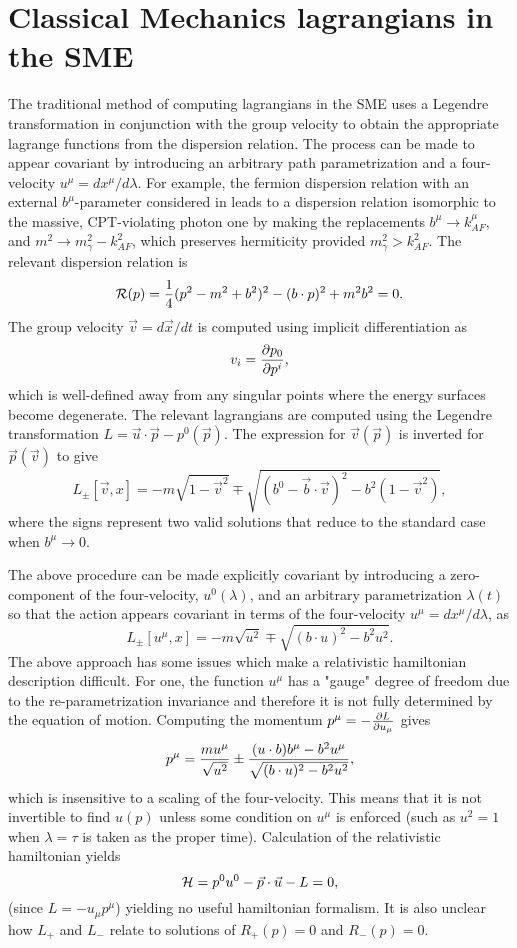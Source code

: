 \documentclass[a4paper]{jpconf}
\def\ga{\gamma}
\def\la{\lambda}
\newcommand{\beq}{\begin{displaymath}}
\newcommand{\eeq}{\end{displaymath}}
\begin{document}
\section{Classical Mechanics lagrangians in the SME}
The traditional method of computing lagrangians in the SME \cite{kosruss} uses a Legendre
transformation in conjunction with the group velocity to obtain the appropriate lagrange functions
from the dispersion relation.  
The process can be made to appear covariant by introducing an arbitrary path parametrization
and a four-velocity $u^\mu = d x^\mu / d \la$.
For example, the fermion dispersion relation with an external $b^\mu$-parameter considered
in \cite{kosruss} leads to a
dispersion relation isomorphic to the massive, CPT-violating photon one by making the replacements 
$b^\mu \rightarrow k_{AF}^\mu$, and $m^2 \rightarrow m_\ga^2 - k_{AF}^2$,
which preserves hermiticity provided $m_\ga^2 > k_{AF}^2$.
The relevant dispersion relation is
\beq
{\cal R}(p) = {1 \over 4} (p^2 - m^2 + b^2)^2 - (b \cdot p)^2 + m^2 b^2 = 0.
\eeq
The group velocity $\vec v = d \vec x / d t$ is computed using implicit differentiation as
\beq
{v_i} = {\partial p_0 \over  \partial p^i},
\eeq
which is well-defined away from any singular points where the energy surfaces become degenerate.
The relevant lagrangians are computed using the Legendre transformation $L = \vec  u \cdot \vec p - p^0(\vec p)$.
The expression for $\vec v (\vec p)$ is inverted for $\vec p(\vec v)$ to give
\beq
L_{\pm}[\vec v, x] = -m \sqrt{1 - \vec v^2} \mp \sqrt{(b^0 - \vec b \cdot \vec v)^2 - b^2 (1 - \vec v^2)},
\eeq
where the signs represent two valid solutions that reduce to the standard case when 
$b^\mu \rightarrow 0$.

The above procedure can be made explicitly covariant by introducing a zero-component 
of the four-velocity, $u^0(\la)$, and an 
arbitrary parametrization $\la(t)$ so that the action appears covariant in terms of the
four-velocity $u^\mu = d x^\mu  / d \la$, as
\beq
L_{\pm}[u^\mu, x] = -m \sqrt{u^2} \mp \sqrt{(b \cdot u)^2 - b^2 u^2}.
\eeq
The above approach has some issues which make a relativistic hamiltonian description difficult.
For one, the function $u^\mu$ has a "gauge" degree of freedom due to the
re-parametrization invariance and therefore it is not fully determined by the equation
of motion.
Computing the momentum $p^\mu = - {\partial L \over \partial u_\mu}$ gives
\beq
p^\mu = {m u^\mu \over \sqrt{u^2}} \pm 
{(u \cdot b) b^\mu - b^2 u^\mu \over \sqrt{(b \cdot u)^2 - b^2 u^2}},
\eeq
which is insensitive to a scaling of the four-velocity.  
This means that it is not invertible to find $u(p)$ unless some condition on $u^\mu$ is
enforced (such as $u^2 = 1$ when $\la = \tau$ is taken as the proper time).
Calculation of the relativistic hamiltonian yields
$$
{\cal H} = p^0 u^0 - \vec p \cdot \vec u - L = 0,
$$
(since $L = - u_\mu p^\mu$) yielding no useful hamiltonian formalism.
It is also unclear how $L_+$ and $L_-$ relate to solutions of $R_+ (p) = 0$ and $R_-(p) = 0$.
\end{document}
